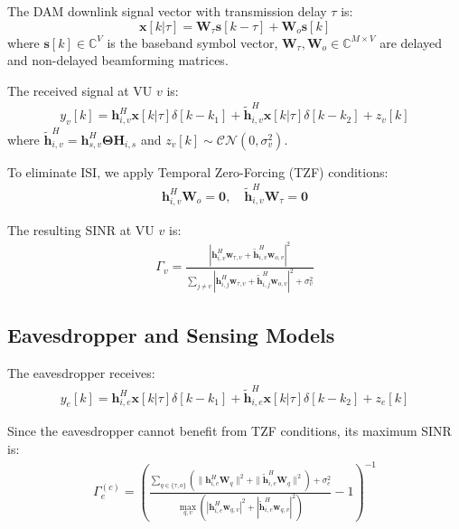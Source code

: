 \documentclass[conference]{IEEEtran}
\begin{document}
The DAM downlink signal vector with transmission delay $\tau$ is:
\begin{equation}
    \mathbf{x}[k|\tau] = \mathbf{W}_{\tau} \mathbf{s}[k - \tau] + \mathbf{W}_{o} \mathbf{s}[k]
\end{equation}
where $\mathbf{s}[k]\in\mathbb{C}^V$ is the baseband symbol vector, $\mathbf{W}_{\tau}, \mathbf{W}_{o} \in \mathbb{C}^{M \times V}$ are delayed and non-delayed beamforming matrices.

The received signal at VU $v$ is:
\begin{align}
    y_v[k] = \mathbf{h}_{i,v}^H \mathbf{x}[k|\tau] \delta[k-k_1] + \tilde{\mathbf{h}}_{i,v}^H\mathbf{x}[k|\tau] \delta[k-k_2] + z_v[k]
\end{align}
where $\tilde{\mathbf{h}}_{i,v}^H = {\mathbf{h}}_{s,v}^{H} \boldsymbol{\Theta} {\mathbf{H}}_{i,s}$ and $z_v[k] \sim \mathcal{CN}(0, \sigma^2_v)$.

To eliminate ISI, we apply Temporal Zero-Forcing (TZF) conditions:
\begin{align}
\mathbf{h}_{i,v}^H \mathbf{W}_{o} = \mathbf{0}, \quad \tilde{\mathbf{h}}_{i,v}^H\mathbf{W}_{\tau} = \mathbf{0}
\end{align}

The resulting SINR at VU $v$ is:
\begin{align}
\Gamma_v = \frac{|\mathbf{h}_{i,v}^H\mathbf{w}_{\tau,v}+ \tilde{\mathbf{h}}_{i,v}^H\mathbf{w}_{o,v}|^2}{\sum_{j\neq v}|\mathbf{h}_{i,j}^H\mathbf{w}_{\tau,v}+ \tilde{\mathbf{h}}_{i,j}^H\mathbf{w}_{o,v}|^2+\sigma_v^2}
\end{align}

\subsection{Eavesdropper and Sensing Models}

The eavesdropper receives:
\begin{align}
    y_e[k] = \mathbf{h}_{i,e}^H \mathbf{x}[k|\tau]\delta[k - k_1] + \tilde{\mathbf{h}}_{i,e}^H \mathbf{x}[k|\tau]\delta[k - k_2] + z_e[k]
\end{align}

Since the eavesdropper cannot benefit from TZF conditions, its maximum SINR is:
\begin{align}
\Gamma^{(c)}_e = \left(\frac{\sum_{q\in\{\tau,o\}}(\|\mathbf{h}^H_{i,e}\mathbf{W}_q\|^2+\|\tilde{\mathbf{h}}^H_{i,e}\mathbf{W}_q\|^2)+\sigma^2_e}{\max_{q,v} (|\mathbf{h}^H_{i,e}\mathbf{w}_{q,v}|^2+|\tilde{\mathbf{h}}^H_{i,e}\mathbf{w}_{q,v}|^2)}-1\right)^{-1}
\end{align}
\end{document}
